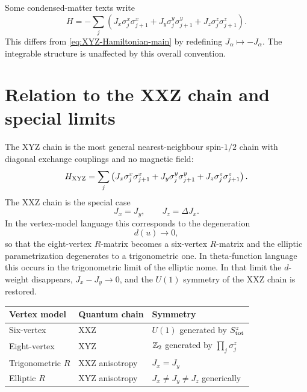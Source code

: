 \begin{remark}
Some condensed-matter texts write
\begin{equation}
    H=-\sum_j
    \left(
        J_x\sigma_j^x\sigma_{j+1}^x
        +J_y\sigma_j^y\sigma_{j+1}^y
        +J_z\sigma_j^z\sigma_{j+1}^z
    \right).
\end{equation}
This differs from \cref{eq:XYZ-Hamiltonian-main} by redefining
$J_{\alpha}\mapsto -J_{\alpha}$.  The integrable structure is unaffected by this
overall convention.
\end{remark}

\section{Relation to the XXZ chain and special limits}
\label{sec:eight-vertex-special-limits}

The XYZ chain is the most general nearest-neighbour spin-$1/2$ chain with
diagonal exchange couplings and no magnetic field:
\begin{equation}
\label{eq:XYZ-general-H}
    H_{\rm XYZ}
    =
    \sum_j
    \left(
        J_x\sigma_j^x\sigma_{j+1}^x
        +J_y\sigma_j^y\sigma_{j+1}^y
        +J_z\sigma_j^z\sigma_{j+1}^z
    \right).
\end{equation}
The XXZ chain is the special case
\begin{equation}
\label{eq:XXZ-as-XYZ-special-case}
    J_x=J_y,
    \qquad
    J_z=\Delta J_x .
\end{equation}
In the vertex-model language this corresponds to the degeneration
\begin{equation}
\label{eq:eight-to-six-d-zero}
    d(u)\to0,
\end{equation}
so that the eight-vertex $R$-matrix becomes a six-vertex $R$-matrix and the
elliptic parametrization degenerates to a trigonometric one.  In theta-function
language this occurs in the trigonometric limit of the elliptic nome.  In that
limit the $d$-weight disappears, $J_x-J_y\to0$, and the $U(1)$ symmetry of the
XXZ chain is restored.

\begin{center}
\begin{tabular}{@{}lll@{}}
\toprule
Vertex model & Quantum chain & Symmetry \\
\midrule
Six-vertex & XXZ & $U(1)$ generated by $S^z_{\rm tot}$ \\
Eight-vertex & XYZ & $\mathbb{Z}_2$ generated by $\prod_j\sigma_j^z$ \\
Trigonometric $R$ & XXZ anisotropy & $J_x=J_y$ \\
Elliptic $R$ & XYZ anisotropy & $J_x\neq J_y\neq J_z$ generically \\
\bottomrule
\end{tabular}
\end{center}

